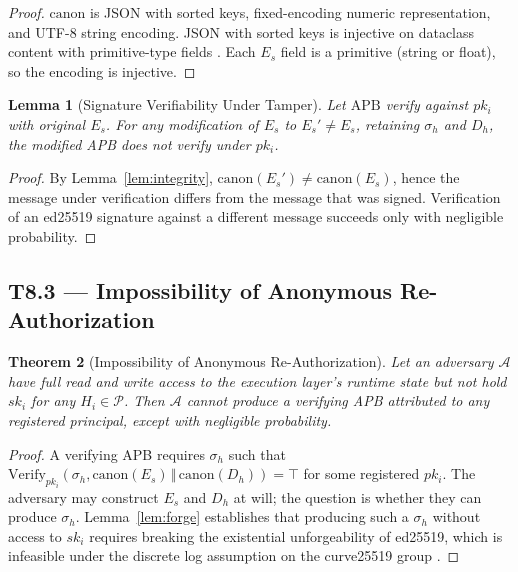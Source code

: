 \documentclass[11pt]{article}
\newtheorem{theorem}{Theorem}[section]
\newtheorem{lemma}[theorem]{Lemma}
\newcommand{\Pset}{\mathcal{P}}
\newcommand{\Es}{E_s}
\newcommand{\Dh}{D_h}
\newcommand{\sigh}{\sigma_h}
\newcommand{\Hi}{H_i}
\newcommand{\ski}{sk_i}
\newcommand{\pki}{pk_i}
\newcommand{\APB}{\mathrm{APB}}
\begin{document}
\begin{proof}
$\mathrm{canon}$ is JSON with sorted keys, fixed-encoding numeric
representation, and UTF-8 string encoding. JSON with sorted keys is
injective on dataclass content with primitive-type fields
\citep{rfc8259}. Each $\Es$ field is a primitive (string or float),
so the encoding is injective.
\end{proof}

\begin{lemma}[Signature Verifiability Under Tamper]
\label{lem:tamper}
Let $\APB$ verify against $\pki$ with original $\Es$. For any
modification of $\Es$ to $\Es' \neq \Es$, retaining $\sigh$ and $\Dh$,
the modified APB does not verify under $\pki$.
\end{lemma}

\begin{proof}
By Lemma~\ref{lem:integrity}, $\mathrm{canon}(\Es') \neq
\mathrm{canon}(\Es)$, hence the message under verification differs
from the message that was signed. Verification of an ed25519
signature against a different message succeeds only with negligible
probability.
\end{proof}

\subsection{T8.3 --- Impossibility of Anonymous Re-Authorization}
\label{sec:t83}

\begin{theorem}[Impossibility of Anonymous Re-Authorization]
\label{thm:anonimp}
Let an adversary $\mathcal{A}$ have full read and write access to the
execution layer's runtime state but not hold $\ski$ for any
$\Hi \in \Pset$. Then $\mathcal{A}$ cannot produce a verifying APB
attributed to any registered principal, except with negligible
probability.
\end{theorem}

\begin{proof}
A verifying APB requires $\sigh$ such that
$\mathrm{Verify}_{\pki}(\sigh, \mathrm{canon}(\Es) \,\Vert\,
\mathrm{canon}(\Dh)) = \top$ for some registered $\pki$. The
adversary may construct $\Es$ and $\Dh$ at will; the question is
whether they can produce $\sigh$. Lemma~\ref{lem:forge} establishes
that producing such a $\sigh$ without access to $\ski$ requires
breaking the existential unforgeability of ed25519, which is
infeasible under the discrete log assumption on the curve25519
group \citep{bernstein2012highspeed}.
\end{proof}
\end{document}
